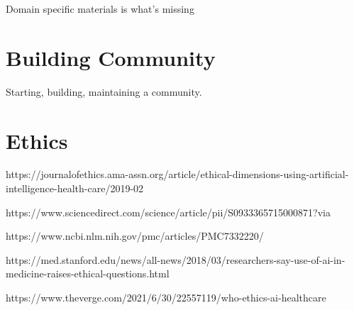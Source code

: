 \documentclass[../main.tex]{subfiles}
\begin{document}
        Domain specific materials is what's missing

    \section{Building Community}

        Starting, building, maintaining a community.

    \section{Ethics}

    https://journalofethics.ama-assn.org/article/ethical-dimensions-using-artificial-intelligence-health-care/2019-02

    https://www.sciencedirect.com/science/article/pii/S0933365715000871?via%

    https://www.ncbi.nlm.nih.gov/pmc/articles/PMC7332220/

    https://med.stanford.edu/news/all-news/2018/03/researchers-say-use-of-ai-in-medicine-raises-ethical-questions.html

    https://www.theverge.com/2021/6/30/22557119/who-ethics-ai-healthcare
\end{document}
